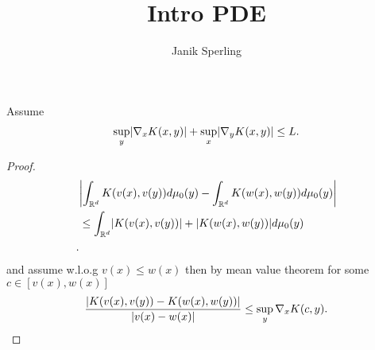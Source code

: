 \documentclass[a4paper]{report}
\title{Intro PDE}
\author{Janik Sperling}
\begin{document}
% 
% 
% 
% 
% 
% 
% 
% 
% 
% 
% 
\begin{exercise}
 Assume
 \begin{align*}
   \sup_{y} \lvert\nabla_x K(x,y)\rvert + \sup_{x} \lvert \nabla_y K(x,y)\rvert \le L
 .\end{align*}
\end{exercise}
\begin{proof}
  \begin{align*}
    &\abs*{\int_{\mathbb{R}^{d} }K(v(x),v(y)) d\mu_0(y) - \int_{\mathbb{R}^{d} }K(w(x),w(y)) d\mu_0(y)}\\
    &\le  \int_{\mathbb{R}^{d} } \abs{K(v(x),v(y))}+ \abs{K(w(x), w(y))} d\mu_0(y)\\
  .\end{align*}
  and assume w.l.o.g $v(x) \le  w(x)$ then by mean value theorem for some  $c \in  [v(x),w(x)]$
  \begin{align*} 
    \frac{\lvert K(v(x),v(y)) - K(w(x),w(y))\rvert}{\lvert v(x)-w(x)\rvert}  \le \sup_{y} \nabla_x K(c,y)
  .\end{align*}
\end{proof}
\end{document}
